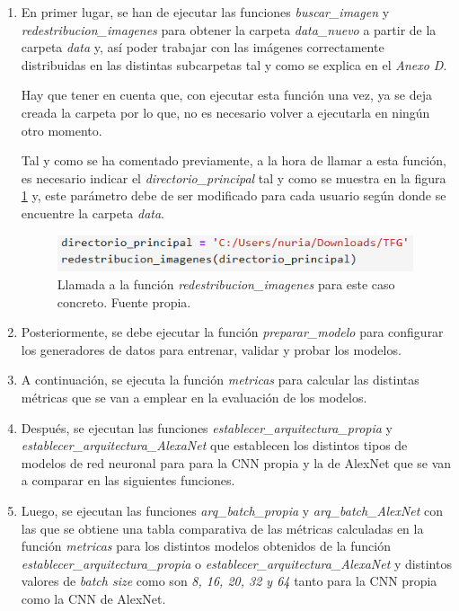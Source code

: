 \begin{enumerate}
    \item En primer lugar, se han de ejecutar las funciones \textit{buscar\_imagen} y \textit{redestribucion\_imagenes} para obtener la carpeta \textit{data\_nuevo} a partir de la carpeta \textit{data} y, así poder trabajar con las imágenes correctamente distribuidas en las distintas subcarpetas tal y como se explica en el \textit{Anexo D}. 
    
    Hay que tener en cuenta que, con ejecutar esta función una vez, ya se deja creada la carpeta por lo que, no es necesario volver a ejecutarla en ningún otro momento.

    Tal y como se ha comentado previamente, a la hora de llamar a esta función, es necesario indicar el \textit{directorio\_principal} tal y como se muestra en la figura \ref{fig:llamar_funcion_redistrib_imagenes} y, este parámetro debe de ser modificado para cada usuario según donde se encuentre la carpeta \textit{data}.
    \begin{figure}[h]
        \centering
        \includegraphics[width=0.99\textwidth]{img/llamar_funcion_redistrib_imagenes.PNG}
        \caption{Llamada a la función \textit{redestribucion\_imagenes} para este caso concreto. Fuente propia.}
        \label{fig:llamar_funcion_redistrib_imagenes}
    \end{figure}
    \FloatBarrier
    
    \item Posteriormente, se debe ejecutar la función \textit{preparar\_modelo} para configurar los generadores de datos para entrenar, validar y probar los modelos.
    \item A continuación, se ejecuta la función \textit{metricas} para calcular las distintas métricas que se van a emplear en la evaluación de los modelos.
    \item Después, se ejecutan las funciones \textit{establecer\_arquitectura\_propia} y \textit{establecer\_arquitectura\_AlexaNet} que establecen los distintos tipos de modelos de red neuronal para para la CNN propia y la de AlexNet que se van a comparar en las siguientes funciones.
    \item Luego, se ejecutan las funciones \textit{arq\_batch\_propia} y \textit{arq\_batch\_AlexNet} con las que se obtiene una tabla comparativa de las métricas calculadas en la función \textit{metricas} para los distintos modelos obtenidos de la función \textit{establecer\_arquitectura\_propia} o \textit{establecer\_arquitectura\_AlexaNet} y distintos valores de \textit{batch size} como son \textit{8, 16, 20, 32 y 64} tanto para la CNN propia como la CNN de AlexNet.


\end{enumerate}
